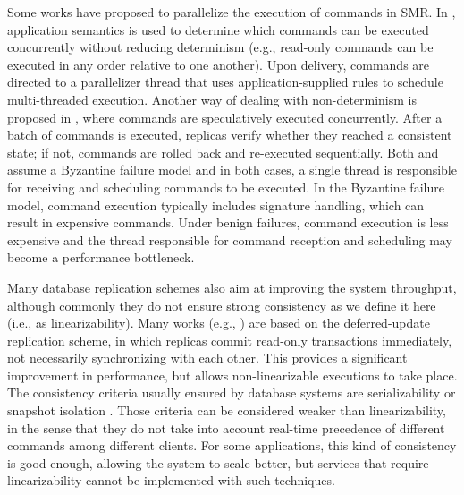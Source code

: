 \documentclass[11pt]{article}
\begin{document}
Some works have proposed to parallelize the execution of commands in SMR.
In \cite{kotla2004htbft}, application semantics is used to determine which commands can be executed concurrently without reducing determinism (e.g., read-only commands can be executed in any order relative to one another).
Upon delivery, commands are directed to a parallelizer thread that uses application-supplied rules to schedule multi-threaded execution.
Another way of dealing with non-determinism is proposed in \cite{kapritsos2012eve}, where commands are speculatively executed concurrently.
After a batch of commands is executed, replicas verify whether they reached a consistent state; if not, commands are rolled back and re-executed sequentially.
Both \cite{kotla2004htbft} and \cite{kapritsos2012eve} assume a Byzantine failure model and in both cases, a single thread is responsible for receiving and scheduling commands to be executed.
In the Byzantine failure model, command execution typically includes signature handling, which can result in expensive commands.
Under benign failures, command execution is less expensive and the thread responsible for command reception and scheduling may become a performance bottleneck.

Many database replication schemes also aim at improving the system throughput, although commonly they do not ensure strong consistency as we define it here (i.e., as linearizability). Many works (e.g., \cite{chundi96dur, kobus2013hybrid, sciascia2012sdur, SousaOMP01}) are based on the deferred-update replication scheme, in which replicas commit read-only transactions immediately, not necessarily synchronizing with each other. This provides a significant improvement in performance, but allows non-linearizable executions to take place. The consistency criteria usually ensured by database systems are serializability \cite{BHG87} or snapshot isolation \cite{LinKJPA09}. Those criteria can be considered weaker than linearizability, in the sense that they do not take into account real-time precedence of different commands among different clients. For some applications, this kind of consistency is good enough, allowing the system to scale better, but services that require linearizability cannot be implemented with such techniques.
\end{document}
